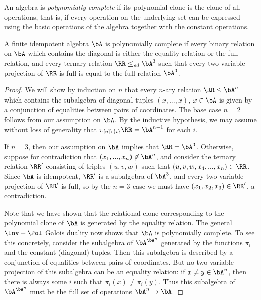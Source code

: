 \begin{defn} An algebra is \emph{polynomially complete} if its polynomial clone is the clone of all operations, that is, if every operation on the underlying set can be expressed using the basic operations of the algebra together with the constant operations.
\end{defn}

\begin{thm} A finite idempotent algebra $\bA$ is polynomially complete if every binary relation on $\bA$ which contains the diagonal is either the equality relation or the full relation, and every ternary relation $\RR \le_{sd} \bA^3$ such that every two variable projection of $\RR$ is full is equal to the full relation $\bA^3$.
\end{thm}
\begin{proof} We will show by induction on $n$ that every $n$-ary relation $\RR \le \bA^n$ which contains the subalgebra of diagonal tuples $(x,...,x)$, $x \in \bA$ is given by a conjunction of equalities between pairs of coordinates. The base case $n = 2$ follows from our assumption on $\bA$. By the inductive hypothesis, we may assume without loss of generality that $\pi_{[n]\setminus\{i\}} \RR = \bA^{n-1}$ for each $i$.

If $n=3$, then our assumption on $\bA$ implies that $\RR = \bA^3$. Otherwise, suppose for contradiction that $(x_1, ..., x_n) \not\in \bA^n$, and consider the ternary relation $\RR'$ consisting of triples $(u,v,w)$ such that $(u,v,w,x_4, ..., x_n) \in \RR$. Since $\bA$ is idempotent, $\RR'$ is a subalgebra of $\bA^3$, and every two-variable projection of $\RR'$ is full, so by the $n=3$ case we must have $(x_1,x_2,x_3) \in \RR'$, a contradiction.

Note that we have shown that the relational clone corresponding to the polynomial clone of $\bA$ is generated by the equality relation. The general $\Inv-\Pol$ Galois duality now shows that $\bA$ is polynomially complete. To see this concretely, consider the subalgebra of $\bA^{\bA^n}$ generated by the functions $\pi_i$ and the constant (diagonal) tuples. Then this subalgebra is described by a conjunction of equalities between pairs of coordinates. But no two-variable projection of this subalgebra can be an equality relation: if $x \ne y \in \bA^n$, then there is always some $i$ such that $\pi_i(x) \ne \pi_i(y)$. Thus this subalgebra of $\bA^{\bA^n}$ must be the full set of operations $\bA^n \rightarrow \bA$.
\end{proof}

